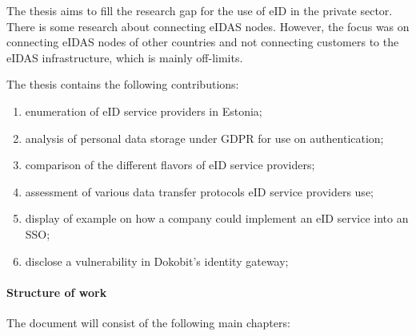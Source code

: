 The thesis aims to fill the research gap for the use of eID in the private sector. There is some research about connecting eIDAS nodes. However, the focus was on connecting eIDAS nodes of other countries and not connecting customers to the eIDAS infrastructure, which is mainly off-limits.

The thesis contains the following contributions:

\begin{enumerate}
    \item enumeration of eID service providers in Estonia;
    \item analysis of personal data storage under GDPR for use on authentication;
    \item comparison of the different flavors of eID service providers;
    \item assessment of various data transfer protocols eID service providers use;
    \item display of example on how a company could implement an eID service into an SSO;
    \item disclose a vulnerability in Dokobit's identity gateway;
\end{enumerate}





\paragraph{Structure of work}
The document will consist of the following main chapters:

